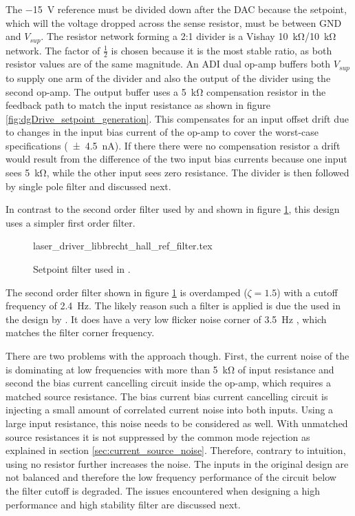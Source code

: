 The \qty{-15}{\V} reference must be divided down after the DAC because the setpoint, which will the voltage dropped across the sense resistor, must be between GND and $V_{sup}$. The resistor network forming a 2:1 divider is a Vishay  \qty{10}{\kilo\ohm}/\qty{10}{\kilo\ohm} network. The factor of $\frac{1}{2}$ is chosen because it is the most stable ratio, as both resistor values are of the same magnitude. An ADI  \cite{datasheet_AD8676} dual op-amp buffers both $V_{sup}$ to supply one arm of the divider and also the output of the divider using the second op-amp. The output buffer uses a \qty{5}{\kilo\ohm} compensation resistor in the feedback path to match the input resistance as shown in figure \ref{fig:dgDrive_setpoint_generation}. This compensates for an input offset drift due to changes in the input bias current of the op-amp to cover the worst-case specifications (\qty{\pm 4.5}{\nA}). If there there were no compensation resistor a drift would result from the difference of the two input bias currents because one input sees \qty{5}{\kilo\ohm}, while the other input sees zero resistance. The divider is then followed by single pole filter and discussed next.

In contrast to the second order filter used by \cite{laser_driver_digital,laser_driver_mosfet_noise,libbrecht_hall} and shown in figure \ref{fig:setpoint_filter_libbrecht_hall}, this design uses a simpler first order filter.
\begin{figure}[ht]
    \centering
        {laser_driver_libbrecht_hall_ref_filter.tex}
    \caption{Setpoint filter used in \cite{laser_driver_digital,laser_driver_mosfet_noise,libbrecht_hall}.}
    \label{fig:setpoint_filter_libbrecht_hall}
\end{figure}

The second order filter shown in figure \ref{fig:setpoint_filter_libbrecht_hall} is overdamped ($\zeta = 1.5$) with a cutoff frequency of \qty{2.4}{\Hz}. The likely reason such a filter is applied is due the  used in the design by \citeauthor{libbrecht_hall} \cite{libbrecht_hall}. It does have a very low flicker noise corner of \qty{3.5}{\Hz} \cite{datasheet_LT1028}, which matches the filter corner frequency.

There are two problems with the approach though. First, the current noise of the  is dominating at low frequencies with more than \qty{5}{\kilo\ohm} of input resistance and second the bias current cancelling circuit inside the op-amp, which requires a matched source resistance. The bias current bias current cancelling circuit is injecting a small amount of correlated current noise into both inputs. Using a large input resistance, this noise needs to be considered as well. With unmatched source resistances it is not suppressed by the common mode rejection as explained in section \ref{sec:current_source_noise}. Therefore, contrary to intuition, using no resistor further increases the noise. The inputs in the original design are not balanced and therefore the low frequency performance of the circuit below the filter cutoff is degraded. The issues encountered when designing a high performance and high stability filter are discussed next.

